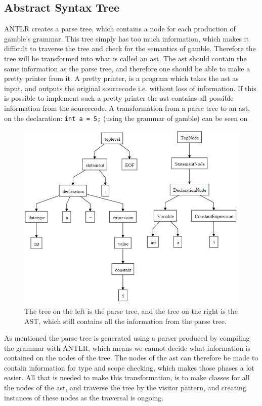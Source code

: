 \subsection*{Abstract Syntax Tree}\label{sec:AST}
ANTLR creates a parse tree, which contains a node for each production of \gls{gamble}'s grammar.
This tree simply has too much information, which makes it difficult to traverse the tree and check for the semantics of \gls{gamble}.
Therefore the tree will be transformed into what is called an \acrfull{ast}.
The \acrshort{ast} should contain the same information as the parse tree, and therefore one should be able to make a pretty printer from it.
A pretty printer, is a program which takes the \acrshort{ast} as input, and outputs the original sourcecode i.e. without loss of information.
If this is possible to implement such a pretty printer the \acrshort{ast} contains all possible information from the sourcecode.
A transformation from a parse tree to an \acrshort{ast}, on the declaration: \texttt{int a = 5;} (using the grammar of \gls{gamble}) can be seen on 

\begin{figure}
		\centering
	 	\includegraphics[width=0.8\linewidth]{figures/Trees/AST.PNG}
		\caption{The tree on the left is the parse tree, and the tree on the right is the AST, which still contains all the information from the parse tree.} \label{image:AST}
\end{figure}

As mentioned the parse tree is generated using a parser produced by compiling the grammar with ANTLR, which means we cannot decide what information is contained on the nodes of the tree.
The nodes of the \acrshort{ast} can therefore be made to contain information for type and scope checking, which makes those phases a lot easier.
All that is needed to make this transformation, is to make classes for all the nodes of the \acrshort{ast}, and traverse the tree by the visitor pattern, and creating instances of these nodes as the traversal is ongoing.



